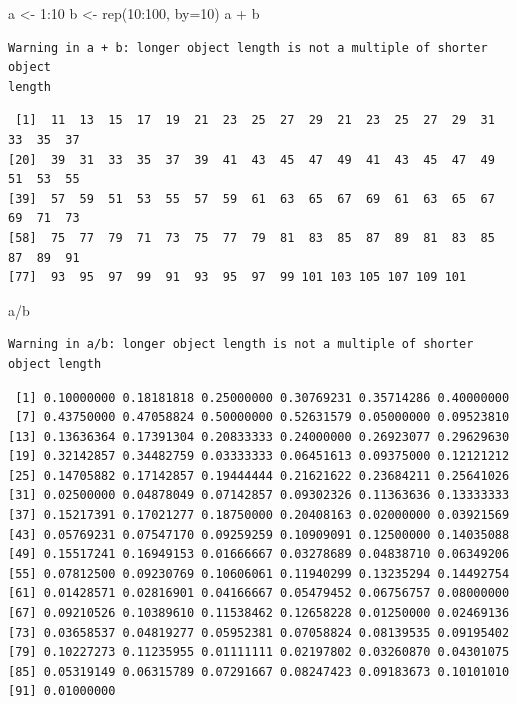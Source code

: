 \documentclass[
  letterpaper,
  DIV=11,
  numbers=noendperiod]{scrreprt}
\newenvironment{Shaded}{\begin{snugshade}}{\end{snugshade}}
\newcommand{\AttributeTok}[1]{\textcolor[rgb]{0.40,0.45,0.13}{#1}}
\newcommand{\DecValTok}[1]{\textcolor[rgb]{0.68,0.00,0.00}{#1}}
\newcommand{\FunctionTok}[1]{\textcolor[rgb]{0.28,0.35,0.67}{#1}}
\newcommand{\NormalTok}[1]{\textcolor[rgb]{0.00,0.23,0.31}{#1}}
\newcommand{\OtherTok}[1]{\textcolor[rgb]{0.00,0.23,0.31}{#1}}
\newcommand{\SpecialCharTok}[1]{\textcolor[rgb]{0.37,0.37,0.37}{#1}}
\begin{document}
\begin{Shaded}
\begin{Highlighting}[]
\NormalTok{a }\OtherTok{\textless{}{-}} \DecValTok{1}\SpecialCharTok{:}\DecValTok{10}
\NormalTok{b }\OtherTok{\textless{}{-}} \FunctionTok{rep}\NormalTok{(}\DecValTok{10}\SpecialCharTok{:}\DecValTok{100}\NormalTok{, }\AttributeTok{by=}\DecValTok{10}\NormalTok{)}
\NormalTok{a }\SpecialCharTok{+}\NormalTok{ b}
\end{Highlighting}
\end{Shaded}

\begin{verbatim}
Warning in a + b: longer object length is not a multiple of shorter object
length
\end{verbatim}

\begin{verbatim}
 [1]  11  13  15  17  19  21  23  25  27  29  21  23  25  27  29  31  33  35  37
[20]  39  31  33  35  37  39  41  43  45  47  49  41  43  45  47  49  51  53  55
[39]  57  59  51  53  55  57  59  61  63  65  67  69  61  63  65  67  69  71  73
[58]  75  77  79  71  73  75  77  79  81  83  85  87  89  81  83  85  87  89  91
[77]  93  95  97  99  91  93  95  97  99 101 103 105 107 109 101
\end{verbatim}

\begin{Shaded}
\begin{Highlighting}[]
\NormalTok{a}\SpecialCharTok{/}\NormalTok{b}
\end{Highlighting}
\end{Shaded}

\begin{verbatim}
Warning in a/b: longer object length is not a multiple of shorter object length
\end{verbatim}

\begin{verbatim}
 [1] 0.10000000 0.18181818 0.25000000 0.30769231 0.35714286 0.40000000
 [7] 0.43750000 0.47058824 0.50000000 0.52631579 0.05000000 0.09523810
[13] 0.13636364 0.17391304 0.20833333 0.24000000 0.26923077 0.29629630
[19] 0.32142857 0.34482759 0.03333333 0.06451613 0.09375000 0.12121212
[25] 0.14705882 0.17142857 0.19444444 0.21621622 0.23684211 0.25641026
[31] 0.02500000 0.04878049 0.07142857 0.09302326 0.11363636 0.13333333
[37] 0.15217391 0.17021277 0.18750000 0.20408163 0.02000000 0.03921569
[43] 0.05769231 0.07547170 0.09259259 0.10909091 0.12500000 0.14035088
[49] 0.15517241 0.16949153 0.01666667 0.03278689 0.04838710 0.06349206
[55] 0.07812500 0.09230769 0.10606061 0.11940299 0.13235294 0.14492754
[61] 0.01428571 0.02816901 0.04166667 0.05479452 0.06756757 0.08000000
[67] 0.09210526 0.10389610 0.11538462 0.12658228 0.01250000 0.02469136
[73] 0.03658537 0.04819277 0.05952381 0.07058824 0.08139535 0.09195402
[79] 0.10227273 0.11235955 0.01111111 0.02197802 0.03260870 0.04301075
[85] 0.05319149 0.06315789 0.07291667 0.08247423 0.09183673 0.10101010
[91] 0.01000000
\end{verbatim}
\end{document}
